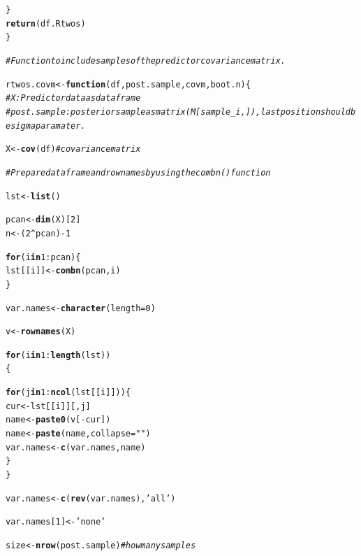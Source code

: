 \documentclass[11pt,a4paper,twoside]{book}\usepackage[]{graphicx}\usepackage[]{color}
\makeatletter
\newcommand{\hlnum}[1]{\textcolor[rgb]{0.686,0.059,0.569}{#1}}%
\newcommand{\hlstr}[1]{\textcolor[rgb]{0.192,0.494,0.8}{#1}}%
\newcommand{\hlcom}[1]{\textcolor[rgb]{0.678,0.584,0.686}{\textit{#1}}}%
\newcommand{\hlopt}[1]{\textcolor[rgb]{0,0,0}{#1}}%
\newcommand{\hlstd}[1]{\textcolor[rgb]{0.345,0.345,0.345}{#1}}%
\newcommand{\hlkwa}[1]{\textcolor[rgb]{0.161,0.373,0.58}{\textbf{#1}}}%
\newcommand{\hlkwb}[1]{\textcolor[rgb]{0.69,0.353,0.396}{#1}}%
\newcommand{\hlkwc}[1]{\textcolor[rgb]{0.333,0.667,0.333}{#1}}%
\newcommand{\hlkwd}[1]{\textcolor[rgb]{0.737,0.353,0.396}{\textbf{#1}}}%
\newenvironment{kframe}{%
 \def\at@end@of@kframe{}%
 \ifinner\ifhmode%
  \def\at@end@of@kframe{\end{minipage}}%
  \begin{minipage}{\columnwidth}%
 \fi\fi%
 \def\FrameCommand##1{\hskip\@totalleftmargin \hskip-\fboxsep
 \colorbox{shadecolor}{##1}\hskip-\fboxsep
     \hskip-\linewidth \hskip-\@totalleftmargin \hskip\columnwidth}%
 \MakeFramed {\advance\hsize-\width
   \@totalleftmargin\z@ \linewidth\hsize
   \@setminipage}}%
 {\par\unskip\endMakeFramed%
 \at@end@of@kframe}
\newenvironment{knitrout}{}{} %
\makeatother
\begin{document}
\begin{knitrout}
\begin{kframe}
\begin{alltt}
        \hlstd{\}}
        \hlkwd{return}\hlstd{(df.Rtwos)}
\hlstd{\}}


\hlcom{#Function to include samples of the predictor covariance matrix.}

\hlstd{rtwos.covm}\hlkwb{<-}\hlkwa{function}\hlstd{(}\hlkwc{df}\hlstd{,} \hlkwc{post.sample}\hlstd{,} \hlkwc{covm}\hlstd{,} \hlkwc{boot.n}\hlstd{)\{}
        \hlcom{# X: Predictor data as data frame}
        \hlcom{# post.sample: posterior sample as matrix (M[sample_i,]), last position should be sigma paramater. }

        \hlstd{X} \hlkwb{<-} \hlkwd{cov}\hlstd{(df)} \hlcom{#covariance matrix}

        \hlcom{#Prepare data frame and rownames by using the combn() function}

        \hlstd{lst} \hlkwb{<-} \hlkwd{list}\hlstd{()}

        \hlstd{pcan} \hlkwb{<-} \hlkwd{dim}\hlstd{(X)[}\hlnum{2}\hlstd{]}
        \hlstd{n} \hlkwb{<-} \hlstd{(}\hlnum{2}\hlopt{^}\hlstd{pcan)}\hlopt{-}\hlnum{1}

        \hlkwa{for} \hlstd{(i} \hlkwa{in} \hlnum{1}\hlopt{:}\hlstd{pcan)\{}
                \hlstd{lst[[i]]} \hlkwb{<-} \hlkwd{combn}\hlstd{(pcan,i)}
        \hlstd{\}}

        \hlstd{var.names} \hlkwb{<-} \hlkwd{character}\hlstd{(}\hlkwc{length} \hlstd{=} \hlnum{0}\hlstd{)}

        \hlstd{v}\hlkwb{<-} \hlkwd{rownames}\hlstd{(X)}

        \hlkwa{for}\hlstd{(i} \hlkwa{in} \hlnum{1}\hlopt{:}\hlkwd{length}\hlstd{(lst))}
        \hlstd{\{}

                \hlkwa{for} \hlstd{(j} \hlkwa{in} \hlnum{1}\hlopt{:}\hlkwd{ncol}\hlstd{(lst[[i]]))\{}
                        \hlstd{cur}\hlkwb{<-} \hlstd{lst[[i]][,j]}
                        \hlstd{name} \hlkwb{<-} \hlkwd{paste0}\hlstd{(v[}\hlopt{-}\hlstd{cur])}
                        \hlstd{name} \hlkwb{<-} \hlkwd{paste}\hlstd{(name,} \hlkwc{collapse} \hlstd{=} \hlstr{" "}\hlstd{)}
                        \hlstd{var.names} \hlkwb{<-} \hlkwd{c}\hlstd{(var.names, name)}
                \hlstd{\}}
        \hlstd{\}}

        \hlstd{var.names}\hlkwb{<-}\hlkwd{c}\hlstd{(}\hlkwd{rev}\hlstd{(var.names),} \hlstr{'all'}\hlstd{)}

        \hlstd{var.names[}\hlnum{1}\hlstd{]}\hlkwb{<-}\hlstr{'none'}

        \hlstd{size} \hlkwb{<-} \hlkwd{nrow}\hlstd{(post.sample)}  \hlcom{# how many samples}


\end{alltt}
\end{kframe}
\end{knitrout}
\end{document}
